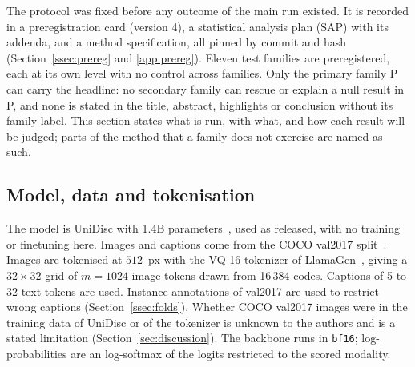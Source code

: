 
The protocol was fixed before any outcome of the main run existed.
It is recorded in a preregistration card (version 4), a statistical analysis plan (SAP) with its addenda, and a method
specification, all pinned by commit and hash (Section~\ref{ssec:prereg} and \ref{app:prereg}).
Eleven test families are preregistered, each at its own level with no control across families.
Only the primary family P can carry the headline: no secondary family can rescue or explain a null result in P, and none is stated in
the title, abstract, highlights or conclusion without its family label.
This section states what is run, with what, and how each result will be judged; parts of the method that a family does not
exercise are named as such.

\subsection{Model, data and tokenisation}\label{ssec:data}
The model is UniDisc with 1.4B parameters~\cite{swerdlow2025unidisc}, used as released, with no training or finetuning here.
Images and captions come from the COCO val2017 split~\cite{lin2014coco}.
Images are tokenised at $512$~px with the VQ-16 tokenizer of LlamaGen~\cite{sun2024llamagen}, giving a $32\times32$ grid of
$m=1024$ image tokens drawn from 16\,384 codes.
Captions of 5 to 32 text tokens are used.
Instance annotations of val2017 are used to restrict wrong captions (Section~\ref{ssec:folds}).
Whether COCO val2017 images were in the training data of UniDisc or of the tokenizer is unknown to the authors and is a stated
limitation (Section~\ref{sec:discussion}).
The backbone runs in \texttt{bf16}; log-probabilities are an \fp{} log-softmax of the logits restricted to the scored modality.

